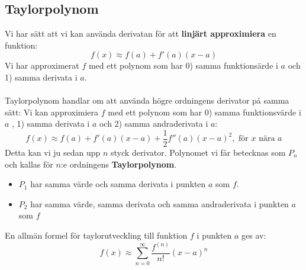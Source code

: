 \documentclass{report}
\begin{document}
\subsection{Taylorpolynom}
Vi har sätt att vi kan använda derivatan för att \textbf{linjärt approximiera} en funktion:
\begin{equation*}
f(x) \approx f(a) + f'(a)(x-a)
\end{equation*}
Vi har approximerat $ f $ med ett polynom som har 0) samma funktionsärde i $ a $ och 1) samma derivata i $ a $.\\\\

\noindent
Taylorpolynom handlar om att använda högre ordningens derivator på samma sätt: Vi kan approximiera $ f $ med ett polynom som har 0) samma funktionsvärde i $ a $ , 1) samma derivata i $ a $ och 2) samma andraderivata i $ a $:
\begin{equation*}
f(x) \approx f(a) + f'(a)(x-a) + \frac{1}{2} f''(a)(x-a)^2,\text{ för } x \text{ nära } a 
\end{equation*}
 Detta kan vi ju sedan upp $ n $ styck derivator. Polynomet vi får betecknas som $ P_n $ och kallas för $ n $:e ordningens \textbf{Taylorpolynom}.

\pagebreak
\begin{itemize}
	\item $ P_1 $ har samma värde och samma derivata i punkten $ a $ som $ f $.
	\item $ P_2 $ har samma värde, samma derivata och samma andraderivata i punkten $ a $ som $ f $ 
\end{itemize}


{
En allmän formel för taylorutveckling till funktion $ f $ i punkten $ a $ ges av:
\begin{equation*}
	f(x) \approx \sum_{n=0}^{ \infty} \frac{f^{(n)}}{n!}(x-a)^n
\end{equation*}
}
\end{document}
